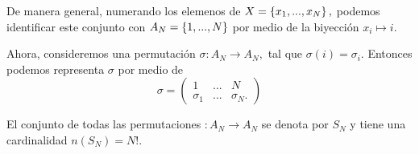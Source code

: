 De manera general, numerando los elemenos de $X=\left\{ x_{1},...,x_{N} \right\},$ podemos identificar este conjunto con $A_{N}=\left\{ 1,...,N \right\}$ por medio de la biyección $x_{i} \mapsto i.$


Ahora, consideremos una permutación $\sigma:A_{N}\to A_{N},$ tal que $\sigma(i)=\sigma_{i}.$ Entonces podemos representa $\sigma$ por medio de 
$$\sigma=
\begin{pmatrix}
1& ... & N \\
\sigma_{1}& ... & \sigma_{N}.
\end{pmatrix}
$$


El conjunto de todas las permutaciones $:A_{N}\to A_{N}$ se denota por $S_{N}$ y tiene una cardinalidad 
$n(S_{N})=N!.$

